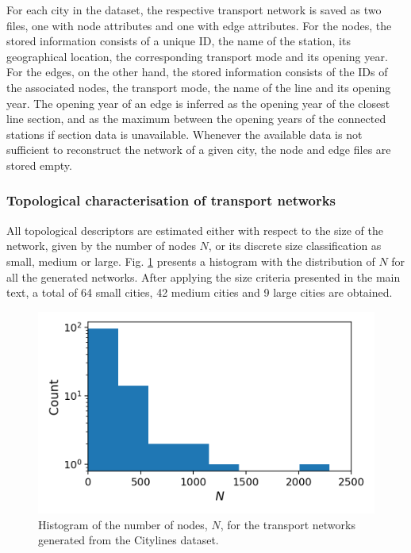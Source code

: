 For each city in the dataset, the respective transport network is saved as two files, one with node attributes and one with edge attributes. For the nodes, the stored information consists of a unique ID, the name of the station, its geographical location, the corresponding transport mode and its opening year. For the edges, on the other hand, the stored information consists of the IDs of the associated nodes, the transport mode, the name of the line and its opening year. The opening year of an edge is inferred as the opening year of the closest line section, and as the maximum between the opening years of the connected stations if section data is unavailable. Whenever the available data is not sufficient to reconstruct the network of a given city, the node and edge files are stored empty.



\subsubsection*{Topological characterisation of transport networks}

All topological descriptors are estimated either with respect to the size of the network, given by the number of nodes $N$, or its discrete size classification as small, medium or large. Fig. \ref{fig:networks_size_dist} presents a histogram with the distribution of $N$ for all the generated networks. After applying the size criteria presented in the main text, a total of 64 small cities, 42 medium cities and 9 large cities are obtained.

\begin{figure}[!h]
	\begin{center}
	\includegraphics[scale=0.75]{./images/task_41/networks_size_dist.png} 
	\end{center}
	\caption{Histogram of the number of nodes, $N$, for the transport networks generated from the Citylines dataset.\\} 
	\label{fig:networks_size_dist} 
\end{figure}


